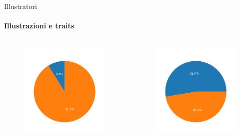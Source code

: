 \documentclass{beamer}
\begin{document}
\begin{darkframes}
  \begin{frame}{Illustratori}
    \framesubtitle{Illustrazioni e traits}
    \begin{columns}
      \begin{column}{0.50\textwidth}
        \begin{figure}
          \centering
          \includegraphics[scale=0.55]{./images/saberface.png}
        \end{figure}
      \end{column}
      \begin{column}{0.50\textwidth}
        \begin{figure}
          \centering
          \includegraphics[scale=0.55]{./images/saberface_take.png}
        \end{figure}
      \end{column}
    \end{columns}
  \end{frame}


\end{darkframes}
\end{document}
